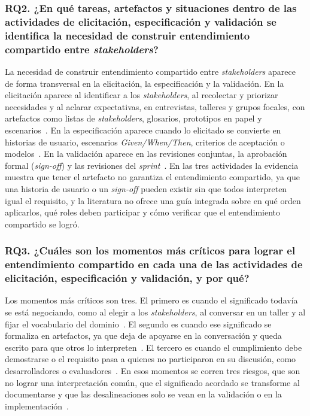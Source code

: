 \documentclass[12pt,letterpaper,oneside]{report}
\begin{document}
\subsubsection{RQ2. ¿En qué tareas, artefactos y situaciones dentro de las
actividades de elicitación, especificación y validación se identifica la
necesidad de construir entendimiento compartido entre \textit{stakeholders}?}
La necesidad de construir entendimiento compartido entre \textit{stakeholders} aparece de
forma transversal en la elicitación, la especificación y la validación. En la elicitación aparece al identificar a los
\textit{stakeholders}, al recolectar y priorizar necesidades y al aclarar
expectativas, en entrevistas, talleres y grupos focales, con artefactos como
listas de \textit{stakeholders}, glosarios, prototipos en papel y
escenarios~\cite{khan2022stakeholders,laporte2023,calefato2015,martins2019}. En
la especificación aparece cuando lo elicitado se convierte en historias de
usuario, escenarios \textit{Given/When/Then}, criterios de aceptación o
modelos~\cite{irshad2021bdd,gupta2022}. En la validación aparece en las
revisiones conjuntas, la aprobación formal (\textit{sign-off}) y las revisiones
del \textit{sprint}~\cite{kunz2016,pacheco2022,laporte2023}. En las tres
actividades la evidencia muestra que tener el artefacto no garantiza el
entendimiento compartido, ya que una historia de usuario o un \textit{sign-off} pueden
existir sin que todos interpreten igual el requisito, y la literatura no ofrece
una guía integrada sobre en qué orden aplicarlos, qué roles deben participar y
cómo verificar que el entendimiento compartido se logró.

\subsubsection{RQ3. ¿Cuáles son los momentos más críticos para lograr el
entendimiento compartido en cada una de las actividades de elicitación,
especificación y validación, y por qué?}
Los momentos más críticos son tres. El primero es cuando el significado todavía
se está negociando, como al elegir a los \textit{stakeholders}, al conversar en
un taller y al fijar el vocabulario del
dominio~\cite{khan2022stakeholders,calefato2015,antonelli2016}. El segundo es
cuando ese significado se formaliza en artefactos, ya que deja de apoyarse en la
conversación y queda escrito para que otros lo
interpreten~\cite{irshad2021bdd,ribeiro2020,laporte2023}. El tercero es cuando
el cumplimiento debe demostrarse o el requisito pasa a quienes no participaron
en su discusión, como desarrolladores o
evaluadores~\cite{gentili2025,pacheco2022,fricker2015}. En esos momentos se
corren tres riesgos, que son no lograr una interpretación común, que el
significado acordado se transforme al documentarse y que las desalineaciones
solo se vean en la validación o en la implementación~\cite{okpara2023,xiao2018}.
\end{document}
